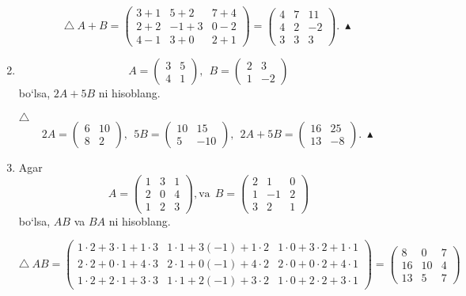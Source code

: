 \begin{enumerate}
$$\triangle\ A+B=\begin{pmatrix}
	3+1&5+2&7+4\\
	2+2&-1+3&0-2\\
	4-1&3+0&2+1
	
\end{pmatrix}=\begin{pmatrix}
4&7&11\\
4&2&-2\\
3&3&3
\end{pmatrix}.\ \blacktriangle$$

\item $$A=\begin{pmatrix}
	3&5\\
	4&1
\end{pmatrix},\ \ B=\begin{pmatrix}
2&3\\
1&-2
\end{pmatrix}$$ bo`lsa, $2A+5B$ ni hisoblang.

$\triangle$
$$2A=\begin{pmatrix}
	6&10\\
	8&2
\end{pmatrix},\ \ 5B=\begin{pmatrix}
10&15\\
5&-10
\end{pmatrix},\ \ 2A+5B=\begin{pmatrix}
16&25\\
13&-8
\end{pmatrix}.\ \blacktriangle$$

\item Agar 
$$A=\begin{pmatrix}
	1&3&1\\
	2&0&4\\
	1&2&3
	\end{pmatrix}, \mbox{va}\ \ B=\begin{pmatrix}
	2&1&0\\
	1&-1&2\\
	3&2&1
\end{pmatrix}$$ bo`lsa, $AB$ va $BA$ ni hisoblang.

$$\triangle\ AB=\begin{pmatrix}
	1\cdot2+3\cdot1+1\cdot3&1\cdot1+3(-1)+1\cdot2&1\cdot0+3\cdot2+1\cdot1\\
	2\cdot2+0\cdot1+4\cdot3&2\cdot1+0(-1)+4\cdot2&2\cdot0+0\cdot2+4\cdot1\\
	1\cdot2+2\cdot1+3\cdot3&1\cdot1+2(-1)+3\cdot2&1\cdot0+2\cdot2+3\cdot1
\end{pmatrix}=\begin{pmatrix}
8&0&7\\
16&10&4\\
13&5&7
\end{pmatrix}$$


\end{enumerate}
